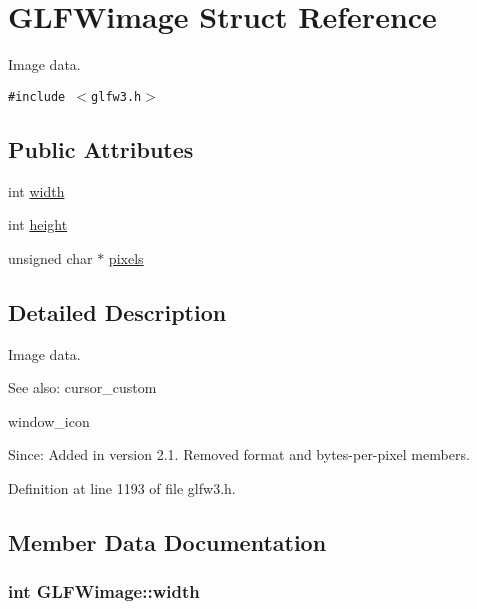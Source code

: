 \hypertarget{struct_g_l_f_wimage}{
\section{GLFWimage Struct Reference}
\label{struct_g_l_f_wimage}
}
Image data.  


{\tt \#include $<$glfw3.h$>$}

\subsection*{Public Attributes}
\begin{CompactItemize}
\item 
int \hyperlink{struct_g_l_f_wimage_f6a71cc999fe6d3aea31dd7e9687d835}{width}
\item 
int \hyperlink{struct_g_l_f_wimage_0b7d95368f0c80d5e5c9875057c7dbec}{height}
\item 
unsigned char $\ast$ \hyperlink{struct_g_l_f_wimage_0c532a5c2bb715555279b7817daba0fb}{pixels}
\end{CompactItemize}


\subsection{Detailed Description}
Image data. 

\begin{Desc}
\item[See also:]cursor\_\-custom 

window\_\-icon\end{Desc}
\begin{Desc}
\item[Since:]Added in version 2.1.  Removed format and bytes-per-pixel members. \end{Desc}


Definition at line 1193 of file glfw3.h.

\subsection{Member Data Documentation}
\hypertarget{struct_g_l_f_wimage_f6a71cc999fe6d3aea31dd7e9687d835}{
\subsubsection[width]{\setlength{\rightskip}{0pt plus 5cm}int {\bf GLFWimage::width}}}
\label{struct_g_l_f_wimage_f6a71cc999fe6d3aea31dd7e9687d835}


